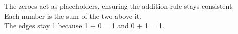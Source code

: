 \documentclass[preview]{standalone}
\begin{document}
\begin{center}
The zeroes act as placeholders, ensuring the addition rule stays consistent.\\Each number is the sum of the two above it.\\The edges stay 1 because 1 + 0 = 1 and 0 + 1 = 1.
\end{center}
\end{document}
